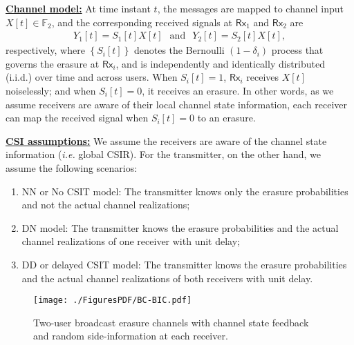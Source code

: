 \documentclass[journal,12pt,draftcls,onecolumn]{IEEEtran}
\newcommand{\msf}{\mathsf}
\newcommand{\lbp}{\left\{}
\newcommand{\rbp}{\right\}}
\begin{document}
\noindent \underline{\bf Channel model:} At time instant $t$, the messages are mapped to channel input $X[t] \in \mathbb{F}_2$, and the corresponding received signals at $\msf{Rx}_1$ and $\msf{Rx}_2$ are
\begin{align}
\label{eq_DL_channel}
Y_1[t] = S_1[t] X[t]~~ \; \mbox{and} \;~~ Y_2[t] = S_2[t] X[t],
\end{align}
respectively, where $\lbp S_i[t]\rbp$ denotes the Bernoulli $(1-\delta_i)$ process that governs the erasure at $\mathsf{Rx}_i$, and is independently and identically distributed (i.i.d.) over time and across users. When $S_i[t]=1$, $\mathsf{Rx}_i$ receives $X[t]$ noiselessly; and when $S_i[t]=0$, it receives an erasure. In other words, as we assume receivers are aware of their local channel state information, each receiver can map the received signal when $S_i[t]=0$ to an erasure.


\noindent \underline{\bf CSI assumptions:} We assume the receivers are aware of the channel state information (\emph{i.e.} global CSIR). For the transmitter, on the other hand, we assume the following scenarios:
\begin{enumerate}

\item NN or No CSIT model: The transmitter knows only the erasure probabilities and not the actual channel realizations;

\item DN model: The transmitter knows the erasure probabilities and the actual channel realizations of one receiver with unit delay;

\item DD or delayed CSIT model: The transmitter knows the erasure probabilities and the actual channel realizations of both receivers with unit delay.

\end{enumerate}


\begin{figure}[!ht]
\centering
\texttt{[image: ./FiguresPDF/BC-BIC.pdf]}
\caption{Two-user broadcast erasure channels with channel state feedback and random side-information at each receiver.\label{Fig:BC-BIC}}
\end{figure}
\end{document}
